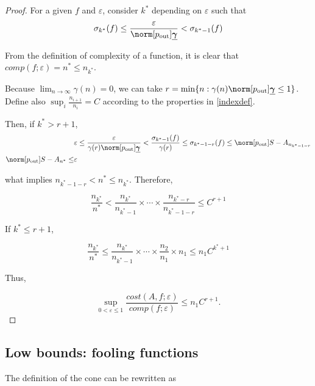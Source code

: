 \documentclass[final]{elsarticle}
\newcommand{\pout}{p_{\text{\rm{out}}}}
\newcommand{\bgamma}{\underline{\boldsymbol\gamma}}
\theoremstyle{definition}
\theoremstyle{remark}
\begin{document}
\begin{proof}
For a given $f$ and $\varepsilon$, consider $k^*$ depending on $\varepsilon$ such that
\begin{equation*}
\sigma_{k^*}(f) \le \frac{\varepsilon}{\norm[\pout]{\bgamma}} < \sigma_{k^*-1}(f)
\end{equation*}

From the definition of complexity of a function, it is clear that $comp(f;\varepsilon)=n^*\le n_{k^*}$.

Because $\lim_{n\rightarrow\infty}\gamma(n)=0$, we can take $r=\min\{n: \gamma(n)\norm[\pout]{\bgamma} \le 1\}$. Define also $\sup_i\frac{n_{i+1}}{n_i}=C$ according to the properties in \ref{indexdef}.

Then, if $k^*>r+1$,
\begin{align*}
& \varepsilon \le \frac{\varepsilon}{\gamma(r)\norm[\pout]{\bgamma}} < \frac{\sigma_{k^*-1}(f)}{\gamma(r)} \le \sigma_{k^*-1-r}(f) \le \norm[\pout]{S-A_{n_{k^*-1-r}}} \\
\norm[\pout]{S-A_{n^*}} \le & \varepsilon
\end{align*}

what implies $n_{k^*-1-r} < n^* \le n_{k^*}$. Therefore,

\begin{equation*}
\frac{n_{k^*}}{n^*} < \frac{n_{k^*}}{n_{k^*-1}}\times\cdots\times\frac{n_{k^*-r}}{n_{k^*-1-r}} \le C^{r+1}
\end{equation*}

If $k^* \le r+1$,

\begin{equation*}
\frac{n_{k^*}}{n^*} \le \frac{n_{k^*}}{n_{k^*-1}}\times\cdots\times\frac{n_{2}}{n_{1}}\times n_{1} \le n_{1}C^{k^*+1}
\end{equation*}

Thus,

\begin{equation*}
\sup_{0 < \varepsilon \le 1} \frac{cost(A,f;\varepsilon)} {comp(f;\varepsilon)} \le n_1C^{r+1}.
\end{equation*}

\end{proof}

\subsection{Low bounds: fooling functions}

The definition of the cone can be rewritten as
\end{document}
